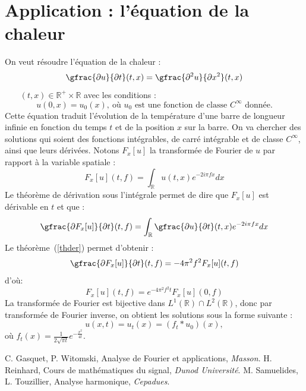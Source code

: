 \section{Application : l'équation de la chaleur}
On veut résoudre l'équation de la chaleur  :
\begin{equation}
\label{equa}
\gfrac{\partial u}{\partial t}(t,x)=\gfrac{\partial^2u}{\partial x^2}
(t,x)
\end{equation}
~~~ $(t,x)\in \mathbb{R}^+ \times \mathbb{R}$
avec les conditions :
\begin{equation}
\label{limi}
u(0,x)=u_0(x),\  \text{o\`u $u_0$ est une fonction de classe $C^\infty$ donnée.}
\end{equation}
Cette équation traduit l'évolution de la température d'une barre de longueur infinie en fonction du temps $t$ et de la position $x$ sur la barre. On va chercher des solutions qui soient des fonctions intégrables, de carré intégrable et de classe $C^\infty$, ainsi que leurs dérivées.
Notons $F_x[u]$ la transformée de Fourier de $u$ par rapport à la variable spatiale :
$$F_x[u](t,f)=\int_{\mathbb{R}}{u(t,x)e^{-2i\pi fx}dx}$$
Le théorème de dérivation sous l'intégrale permet de dire que $F_x[u]$ est dérivable en $t$ et que : 
$$\gfrac{\partial F_x[u]}{\partial t}(t,f)=\int_{\mathbb{R}}{\gfrac{\partial u}{\partial t}(t,x)e^{-2i\pi fx}dx}$$
Le théorème\ (\ref{thder}) permet d'obtenir :
$$\gfrac{\partial F_x[u]}{\partial t}(t,f)=-4\pi ^2f^2F_x[u](t,f)$$
d'o\`u:
$$F_x[u](t,f)=e^{-4\pi ^2 f^2t} F_x[u](0,f)$$ 
La transformée de Fourier est bijective dans $L^1(\mathbb{R})\cap L^2(\mathbb{R})$, donc par transformée de Fourier inverse, on obtient les solutions sous la forme suivante :
$$u(x,t)=u_t(x)=(f_t*u_0)(x),$$
o\`u $f_t(x)=\frac{1}{2\sqrt{\pi t}}e^{-\frac{x^2}{4t}}$.

\tableofcontents
\begin{thebibliography}{99}
 C. Gasquet, P. Witomski, Analyse de Fourier et applications,
{\it Masson}.
 H. Reinhard, Cours de mathématiques du signal, {\it Dunod Université}.
 M. Samuelides, L. Touzillier, Analyse harmonique, {\it Cepadues}.
\end{thebibliography}

